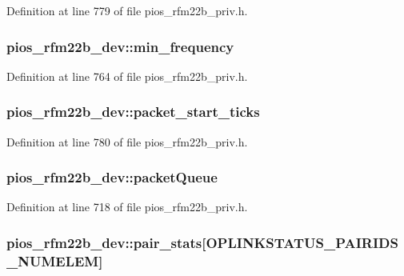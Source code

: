 Definition at line 779 of file pios\-\_\-rfm22b\-\_\-priv.\-h.

\hypertarget{structpios__rfm22b__dev_acfd89dda5551722d12e887369e3e6616}{
\subsubsection[{min\-\_\-frequency}]{ pios\-\_\-rfm22b\-\_\-dev\-::min\-\_\-frequency}}\label{structpios__rfm22b__dev_acfd89dda5551722d12e887369e3e6616}


Definition at line 764 of file pios\-\_\-rfm22b\-\_\-priv.\-h.

\hypertarget{structpios__rfm22b__dev_add7ce31439ee28ce51c07a4167666141}{
\subsubsection[{packet\-\_\-start\-\_\-ticks}]{ pios\-\_\-rfm22b\-\_\-dev\-::packet\-\_\-start\-\_\-ticks}}\label{structpios__rfm22b__dev_add7ce31439ee28ce51c07a4167666141}


Definition at line 780 of file pios\-\_\-rfm22b\-\_\-priv.\-h.

\hypertarget{structpios__rfm22b__dev_ab04a8d36db91686aaf0748e5db71ca0f}{
\subsubsection[{packet\-Queue}]{ pios\-\_\-rfm22b\-\_\-dev\-::packet\-Queue}}\label{structpios__rfm22b__dev_ab04a8d36db91686aaf0748e5db71ca0f}


Definition at line 718 of file pios\-\_\-rfm22b\-\_\-priv.\-h.

\hypertarget{structpios__rfm22b__dev_a6db8d809d116a414eb5c7a826c833bc5}{
\subsubsection[{pair\-\_\-stats}]{ pios\-\_\-rfm22b\-\_\-dev\-::pair\-\_\-stats\mbox{[}O\-P\-L\-I\-N\-K\-S\-T\-A\-T\-U\-S\-\_\-\-P\-A\-I\-R\-I\-D\-S\-\_\-\-N\-U\-M\-E\-L\-E\-M\mbox{]}}}\label{structpios__rfm22b__dev_a6db8d809d116a414eb5c7a826c833bc5}


